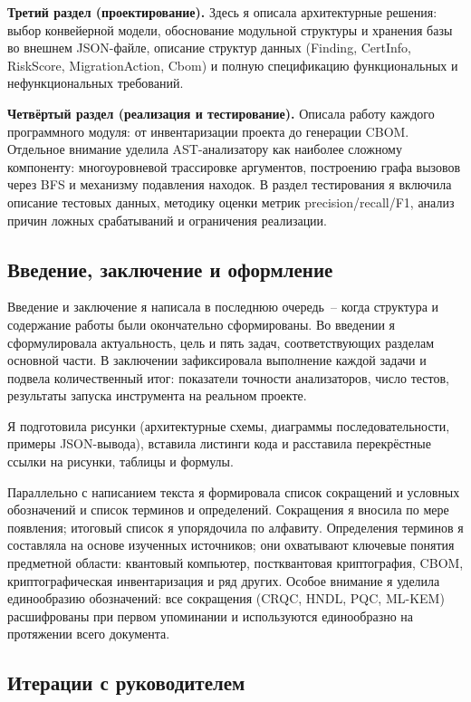 \documentclass{itmo-vkr}
\begin{document}
\textbf{Третий раздел (проектирование).} Здесь я описала архитектурные решения: выбор конвейерной модели, обоснование модульной структуры и хранения базы во внешнем JSON-файле, описание структур данных (Finding, CertInfo, RiskScore, MigrationAction, Cbom) и полную спецификацию функциональных и нефункциональных требований.

\textbf{Четвёртый раздел (реализация и тестирование).} Описала работу каждого программного модуля: от инвентаризации проекта до генерации CBOM. Отдельное внимание уделила AST-анализатору как наиболее сложному компоненту: многоуровневой трассировке аргументов, построению графа вызовов через BFS и механизму подавления находок. В раздел тестирования я включила описание тестовых данных, методику оценки метрик precision/recall/F1, анализ причин ложных срабатываний и ограничения реализации.

\subsection{Введение, заключение и оформление}

Введение и заключение я написала в последнюю очередь~-- когда структура и содержание работы были окончательно сформированы. Во введении я сформулировала актуальность, цель и пять задач, соответствующих разделам основной части. В заключении зафиксировала выполнение каждой задачи и подвела количественный итог: показатели точности анализаторов, число тестов, результаты запуска инструмента на реальном проекте.

Я подготовила рисунки (архитектурные схемы, диаграммы последовательности, примеры JSON-вывода), вставила листинги кода и расставила перекрёстные ссылки на рисунки, таблицы и формулы.

Параллельно с написанием текста я формировала список сокращений и условных обозначений и список терминов и определений. Сокращения я вносила по мере появления; итоговый список я упорядочила по алфавиту. Определения терминов я составляла на основе изученных источников; они охватывают ключевые понятия предметной области: квантовый компьютер, постквантовая криптография, CBOM, криптографическая инвентаризация и ряд других. Особое внимание я уделила единообразию обозначений: все сокращения (CRQC, HNDL, PQC, ML-KEM) расшифрованы при первом упоминании и используются единообразно на протяжении всего документа.

\subsection{Итерации с руководителем}
\end{document}
